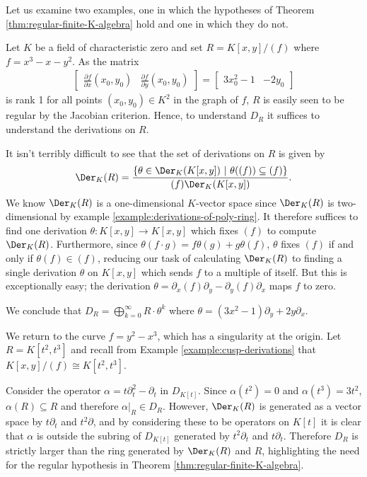 Let us examine two examples, one in which the hypotheses of Theorem \ref{thm:regular-finite-K-algebra} hold and one in which they do not.
\begin{example}\label{example:elliptic-curve}
	Let $K$ be a field of characteristic zero and set $R = K[x,y]/(f)$ where $f = x^3 - x - y^2$. As the matrix
	\begin{align*}
		\begin{bmatrix}
			\frac{\partial f}{\partial x}(x_0,y_0) & \frac{\partial f}{\partial y}(x_0, y_0)
		\end{bmatrix}
		=
		\begin{bmatrix}
			3x_0^2 - 1 & -2y_0
		\end{bmatrix}
	\end{align*}
	is rank 1 for all points $(x_0,y_0)\in K^2$ in the graph of $f$, $R$ is easily seen to be regular by the Jacobian criterion. Hence, to understand $D_{R}$ it suffices to understand the derivations on $R$.

	It isn't terribly difficult to see that the set of derivations on $R$ is given by
	\begin{align*}
		\Der_K(R) = \frac{\{\theta \in \Der_K(K[x,y])~|~ \theta((f)) \subseteq (f)\}}{(f)\Der_K(K[x,y])}.
	\end{align*}
	We know $\Der_K(R)$ is a one-dimensional $K$-vector space since $\Der_K(R)$ is two-dimensional by example \ref{example:derivations-of-poly-ring}. It therefore suffices to find one derivation $\theta:K[x,y] \to K[x,y]$ which fixes $(f)$ to compute $\Der_K(R)$. Furthermore, since $\theta(f\cdot g) = f\theta(g) + g\theta(f)$, $\theta$ fixes $(f)$ if and only if $\theta(f) \in (f)$, reducing our task of calculating $\Der_K(R)$ to finding a single derivation $\theta$ on $K[x,y]$ which sends $f$ to a multiple of itself. But this is exceptionally easy; the derivation $\theta = \partial_x(f)\partial_y - \partial_y(f)\partial_x$ maps $f$ to zero.

	We conclude that $D_{R} = \bigoplus_{k=0}^\infty R\cdot \theta^k$ where $\theta = (3x^2 - 1)\partial_y + 2y\partial_x$.
\end{example}
\begin{example}\label{example:cubic-not-well-behaved}
	We return to the curve $f = y^2 - x^3$, which has a singularity at the origin. Let $R = K[t^2,t^3]$ and recall from Example \ref{example:cusp-derivations} that $K[x,y]/(f) \cong K[t^2,t^3]$. 

	Consider the operator $\alpha = t\partial_t^2 - \partial_t$ in $D_{K[t]}$. Since $\alpha(t^2) = 0$ and $\alpha(t^3) = 3t^2$, $\alpha(R) \subseteq R$ and therefore $\alpha|_{R} \in D_{R}$. However, $\Der_K(R)$ is generated as a vector space by $t\partial_t$ and $t^2\partial$, and by considering these to be operators on $K[t]$ it is clear that $\alpha$ is outside the subring of $D_{K[t]}$ generated by $t^2\partial_t$ and $t\partial_t$. Therefore $D_{R}$ is strictly larger than the ring generated by $\Der_K(R)$ and $R$, highlighting the need for the regular hypothesis in Theorem \ref{thm:regular-finite-K-algebra}.
\end{example}
